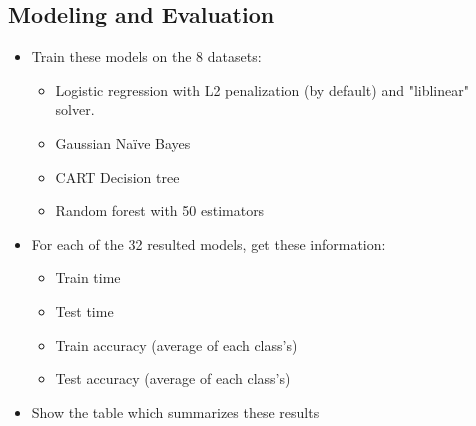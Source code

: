 \documentclass[11pt, a4paper]{article}
\begin{document}
\begin{multicols}{2}
\section{Modeling and Evaluation}

\begin{itemize}
	\item Train these models on the 8 datasets:
	\begin{itemize}
		\item Logistic regression with L2 penalization (by default) and "liblinear" solver.
		\item Gaussian Naïve Bayes 
		\item CART Decision tree
		\item Random forest with 50 estimators
	\end{itemize}
	\item For each of the 32 resulted models, get these information:
	\begin{itemize}
		\item Train time
		\item Test time
		\item Train accuracy (average of each class's)
		\item Test accuracy (average of each class's)
	\end{itemize}
	\item Show the table which summarizes these results
\end{itemize}


\end{multicols}
\end{document}
